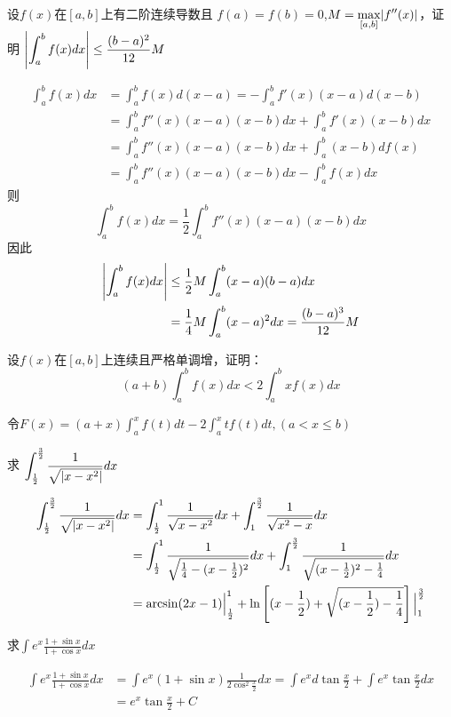 \documentclass{article}
\begin{document}
\begin{examplle}[]
设\(f(x)\)在\([a,b]\)上有二阶连续导数且
\(f(a)=f(b)=0\),\(M=\displaystyle\max_{[a,b]}\abs{f''(x)}\)，证明
\(\displaystyle\abs{\int^b_af(x)dx}\le\frac{(b-a)^2}{12}M\)

\begin{align*}
\int_a^bf(x)dx&=\int_a^bf(x)d(x-a)=-\int_a^bf'(x)(x-a)d(x-b)\\
&=\int_a^bf''(x)(x-a)(x-b)dx+\int_a^bf'(x)(x-b)dx\\
&=\int_a^bf''(x)(x-a)(x-b)dx+\int_a^b(x-b)df(x)\\
&=\int_a^bf''(x)(x-a)(x-b)dx-\int_a^bf(x)dx
\end{align*}
则
\begin{equation*}
\int_a^bf(x)dx=\frac{1}{2}\int_a^bf''(x)(x-a)(x-b)dx
\end{equation*}
因此
\begin{align*}
\abs{\int_a^bf(x)dx}&\le\frac{1}{2}M\int_a^b(x-a)(b-a)dx\\
&=\frac{1}{4}M\int_a^b(x-a)^2dx=\frac{(b-a)^3}{12}M
\end{align*}
\end{examplle}

\begin{examplle}[]
设\(f(x)\)在\([a,b]\)上连续且严格单调增，证明：
\begin{equation*}
(a+b)\int_a^bf(x)dx<2\int_a^bxf(x)dx
\end{equation*}

令\(F(x)=(a+x)\int^x_af(t)dt-2\int_a^xtf(t)dt,(a<x\le b)\)
\end{examplle}

\begin{examplle}[]
求
\(\displaystyle\int_{\frac{1}{2}}^{\frac{3}{2}}\frac{1}{\sqrt{\abs{x-x^2}}}dx\)

\begin{align*}
\int_{\frac{1}{2}}^{\frac{3}{2}}\frac{1}{\sqrt{\abs{x-x^2}}}dx&=
\int_{\frac{1}{2}}^1\frac{1}{\sqrt{x-x^2}}dx+
\int_{1}^{\frac{3}{2}}\frac{1}{\sqrt{x^2-x}}dx\\
&=\int_{\frac{1}{2}}^1\frac{1}{\sqrt{\frac{1}{4}-(x-\frac{1}{2})^2}}dx+
\int_{1}^{\frac{3}{2}}\frac{1}{\sqrt{(x-\frac{1}{2})^2-\frac{1}{4}}}dx\\
&=\arcsin(2x-1)\Big\rvert^1_{\frac{1}{2}}+\ln\left[
(x-\frac{1}{2})+\sqrt{(x-\frac{1}{2})-\frac{1}{4}}
\right]\Big\rvert^{\frac{3}{2}}_1
\end{align*}
\end{examplle}

\begin{examplle}[]
求\(\displaystyle\int e^x\frac{1+\sin x}{1+\cos x}dx\)

\begin{align*}
\int e^x\frac{1+\sin x}{1+\cos x}dx&=\int e^x(1+\sin x)\frac{1}{2\cos^2\frac{x}{2}}dx=
\int e^xd\tan\frac{x}{2}+\int e^x\tan\frac{x}{2}dx\\
&=e^x\tan\frac{x}{2}+C
\end{align*}
\end{examplle}
\end{document}
